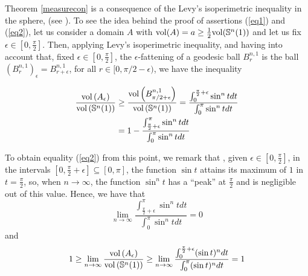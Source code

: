 \documentclass{amsart}
\theoremstyle{definition}
\theoremstyle{remark}
\begin{document}
 Theorem \ref{measurecon} is a consequence of the Levy's isoperimetric inequality in the sphere, (see \cite{MS}).
  To see the idea behind the proof of assertions (\ref{eq1}) and (\ref{eq2}), let us consider a  domain $A$ with ${\rm vol }(A)=a \geq \frac{1}{2} {\rm vol}(\mathbb{S}^n(1))$ and let us fix $\epsilon \in [0,\frac{\pi}{2}]$. Then,  applying Levy's isoperimetric inequality, and having into account that, fixed $\epsilon \in [0,\frac{\pi}{2}]$, the $\epsilon$-fattening of a geodesic ball $B^{n,1}_{r}$ is the ball $(B^{n,1}_{r})_{\epsilon}=B^{n,1}_{r+\epsilon}$, for all $r \in [0,\pi/2-\epsilon)$, we have the inequality
  
\begin{equation}
\begin{aligned}
\frac{{\rm vol}\left(A_\epsilon\right)}{{\rm vol}\left(\mathbb{S}^n(1)\right)}&\geq  \frac{{\rm vol}\left(B^{n,1}_{\pi/2+\epsilon}\right)}{{\rm vol}\left(\mathbb{S}^n(1)\right)}= \frac{\int _0^{\frac{\pi}{2}+\epsilon} \sin^n t dt }{\int _0^\pi \sin^n t dt }\\
&=1-\frac{\int_{\frac{\pi}{2}+\epsilon}^{\pi} \sin^n t dt }{\int _0^\pi \sin^n t dt }
\end{aligned}
\end{equation}

To obtain equality (\ref{eq2}) from this point, we remark that , given $\epsilon \in [0,\frac{\pi}{2}]$,  in the intervals $[0, \frac{\pi}{2}+\epsilon] \subseteq [0,\pi]$, the function $\sin t$ attains its maximum of $1$ in $t=\frac{\pi}{2}$, so, when $n \to \infty$, the function $\sin^n t$ has a ``peak'' at $\frac{\pi}{2}$ and is negligible out of this value. Hence, we have that
\begin{equation}
 \lim_{n \to \infty}\frac{\int_{\frac{\pi}{2}+\epsilon}^{\pi} \sin^n t dt }{\int _0^\pi \sin^n t dt }=0
\end{equation}
\noindent and
\begin{equation}
1\geq \lim_{n \to \infty} \frac{{\rm vol}\left(A_\epsilon\right)}{{\rm vol}\left(\mathbb{S}^n(1)\right)}\geq  \lim_{n \to \infty} \frac{\int _0^{\frac{\pi}{2}+\epsilon} (\sin t)^n dt }{\int _0^\pi (\sin t)^n dt   }=1
\end{equation}
\medskip
\end{document}
